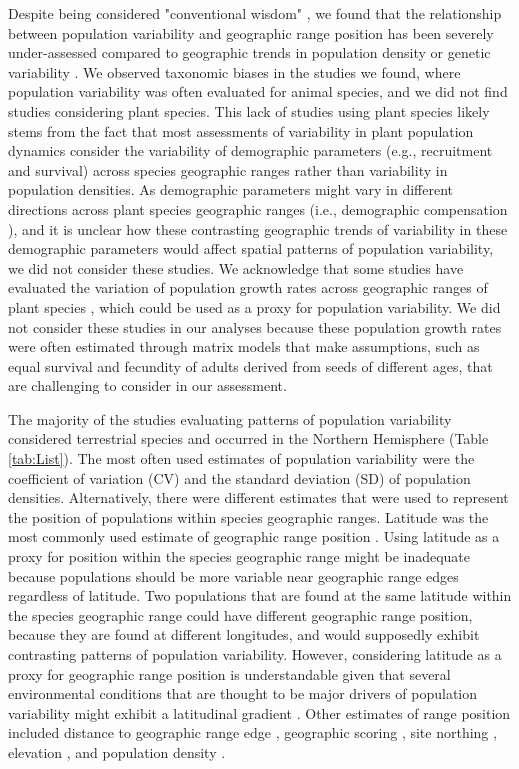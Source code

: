 Despite being considered "conventional wisdom" \parencite{vucetich2003}, we found that the relationship between population variability and geographic range position has been severely under-assessed compared to geographic trends in population density or genetic variability \parencite{sexton2009,pironon2017}. We observed taxonomic biases in the studies we found, where population variability was often evaluated for animal species, and we did not find studies considering plant species. This lack of studies using plant species likely stems from the fact that most assessments of variability in plant population dynamics consider the variability of demographic parameters (e.g., recruitment and survival) across species geographic ranges \parencite{villellas2013, pironon2018} rather than variability in population densities. As demographic parameters might vary in different directions across plant species geographic ranges (i.e., demographic compensation \parencite{doak2010,villellas2015, pironon2018}), and it is unclear how these contrasting geographic trends of variability in these demographic parameters would affect spatial patterns of population variability, we did not consider these studies. We acknowledge that some studies have evaluated the variation of population growth rates across geographic ranges of plant species \parencite{volis2004,kluth2005,angert2009}, which could be used as a proxy for population variability. We did not consider these studies in our analyses because these population growth rates were often estimated through matrix models that make assumptions, such as equal survival and fecundity of adults derived from seeds of different ages, that are challenging to consider in our assessment.


The majority of the studies evaluating patterns of population variability considered terrestrial species and occurred in the Northern Hemisphere (Table \ref{tab:List}). The most often used estimates of population variability were the coefficient of variation (CV) and the standard deviation (SD) of population densities. Alternatively, there were different estimates that were used to represent the position of populations within species geographic ranges. Latitude was the most commonly used estimate of geographic range position  \parencite{hansson1985,forchhammer1993, thomas1994, saether2008}. Using latitude as a proxy for position within the species geographic range might be inadequate because populations should be more variable near geographic range edges regardless of latitude. Two populations that are found at the same latitude within the species geographic range could have different geographic range position, because they are found at different longitudes, and would supposedly exhibit contrasting patterns of population variability. However, considering latitude as a proxy for geographic range position is understandable given that several environmental conditions that are thought to be major drivers of population variability might exhibit a latitudinal gradient \parencite{hansson1985}. Other estimates of range position included distance to geographic range edge \parencite{curnutt1996}, geographic scoring \parencite{saitoh1998}, site northing \parencite{oliver2012}, elevation \parencite{fukaya2014}, and population density \parencite{williams2003}. 


